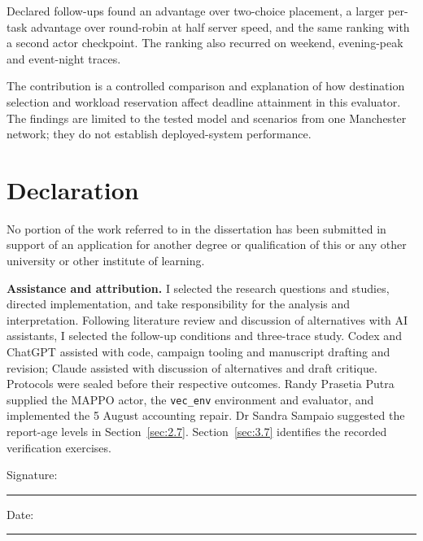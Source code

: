 \documentclass[12pt,a4paper]{article}
\begin{document}
Declared follow-ups found an advantage over two-choice placement, a larger per-task advantage over round-robin at half server speed, and the same ranking with a second actor checkpoint. The ranking also recurred on weekend, evening-peak and event-night traces.

The contribution is a controlled comparison and explanation of how destination selection and workload reservation affect deadline attainment in this evaluator. The findings are limited to the tested model and scenarios from one Manchester network; they do not establish deployed-system performance.


\clearpage
\section*{Declaration}
No portion of the work referred to in the dissertation has been submitted in support of an application for another degree or qualification of this or any other university or other institute of learning.

\textbf{Assistance and attribution.} I selected the research questions and studies, directed implementation, and take responsibility for the analysis and interpretation. Following literature review and discussion of alternatives with AI assistants, I selected the follow-up conditions and three-trace study. Codex and ChatGPT assisted with code, campaign tooling and manuscript drafting and revision; Claude assisted with discussion of alternatives and draft critique. Protocols were sealed before their respective outcomes. Randy Prasetia Putra supplied the MAPPO actor, the \texttt{vec\_env} environment and evaluator, and implemented the 5 August accounting repair. Dr Sandra Sampaio suggested the report-age levels in Section~\ref{sec:2.7}. Section~\ref{sec:3.7} identifies the recorded verification exercises.

\bigskip
Signature: \rule{60mm}{0.3pt}\qquad Date: \rule{25mm}{0.3pt}
\clearpage
\end{document}
